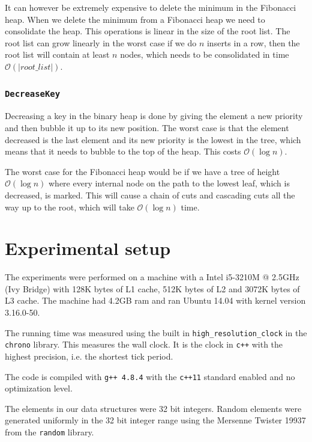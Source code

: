 \documentclass[a4paper,oneside,article,11pt]{memoir}
\begin{document}
It can however be extremely expensive to delete the minimum in the Fibonacci heap. When we delete the minimum from a Fibonacci heap we need to consolidate the heap. This operations is linear in the size of the root list. The root list can grow linearly in the worst case if we do $n$ inserts in a row, then the root list will contain at least $n$ nodes, which needs to be consolidated in time $\mathcal{O}(\vert root\_list \vert)$.

\subsection{\texttt{DecreaseKey}}
Decreasing a key in the binary heap is done by giving the element a new priority and then bubble it up to its new position. The worst case is that the element decreased is the last element and its new priority is the lowest in the tree, which means that it needs to bubble to the top of the heap. This costs $\mathcal{O}(\log n)$.

The worst case for the Fibonacci heap would be if we have a tree of height $\mathcal{O}(\log n)$ where every internal node on the path to the lowest leaf, which is decreased, is marked. This will cause a chain of cuts and cascading cuts all the way up to the root, which will take $\mathcal{O}(\log n)$ time.

\chapter{Experimental setup}
\label{chtp:experiment_setup}

The experiments were performed on a machine with a Intel i5-3210M @ 2.5GHz (Ivy Bridge) with 128K bytes of L1 cache, 512K bytes of L2 and 3072K bytes of L3 cache. The machine had 4.2GB ram and ran Ubuntu 14.04 with kernel version 3.16.0-50.

The running time was measured using the built in \texttt{high\_resolution\_clock} in the \texttt{chrono} library. This measures the wall clock. It is the clock in \texttt{c++} with the highest precision, i.e. the shortest tick period.

The code is compiled with \texttt{g++ 4.8.4} with the \texttt{c++11} standard enabled and no optimization level.

The elements in our data structures were 32 bit integers. Random elements were generated uniformly in the 32 bit integer range using the Mersenne Twister 19937 from the \texttt{random} library.
\end{document}
